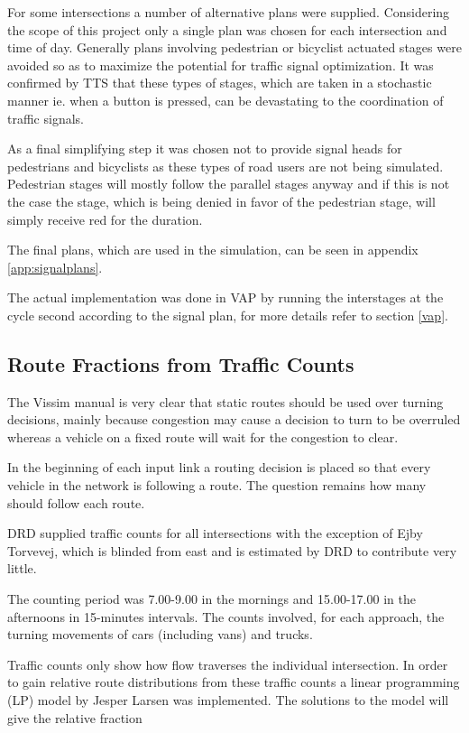 For some intersections a number of alternative plans were supplied. Considering the scope of this project only a single plan was chosen for each intersection and time of day. Generally plans involving pedestrian or bicyclist actuated stages were avoided so as to maximize the potential for traffic signal optimization. It was confirmed by TTS that these types of stages, which are taken in a stochastic manner ie. when a button is pressed, can be devastating to the coordination of traffic signals.

As a final simplifying step it was chosen not to provide signal heads for pedestrians and bicyclists as these types of road users are not being simulated. Pedestrian stages will mostly follow the parallel stages anyway and if this is not the case the stage, which is being denied in favor of the pedestrian stage, will simply receive red for the duration.

The final plans, which are used in the simulation, can be seen in appendix \ref{app:signalplans}.

The actual implementation was done in VAP by running the interstages at the cycle second according to the signal plan, for more details refer to section \ref{vap}.

\subsection{Route Fractions from Traffic Counts}
\label{routefractions}
The Vissim manual is very clear that static routes should be used over turning decisions, mainly because congestion may cause a decision to turn to be overruled whereas a vehicle on a fixed route will wait for the congestion to clear.

In the beginning of each input link a routing decision is placed so that every vehicle in the network is following a route. The question remains how many should follow each route.

DRD supplied traffic counts for all intersections with the exception of Ejby Torvevej, which is blinded from east and is estimated by DRD to contribute very little.

The counting period was 7.00-9.00 in the mornings and 15.00-17.00 in the afternoons in 15-minutes intervals. The counts involved, for each approach, the turning movements of cars (including vans) and trucks. 

Traffic counts only show how flow traverses the individual intersection. In order to gain relative route distributions from these traffic counts a linear programming (LP) model by Jesper Larsen was implemented. The solutions to the model will give the relative fraction 

